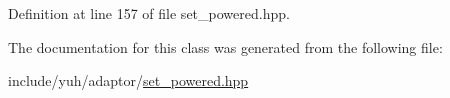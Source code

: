 \-Definition at line 157 of file set\-\_\-powered.\-hpp.



\-The documentation for this class was generated from the following file\-:\begin{DoxyCompactItemize}
\item 
include/yuh/adaptor/\hyperlink{set__powered_8hpp}{set\-\_\-powered.\-hpp}\end{DoxyCompactItemize}
